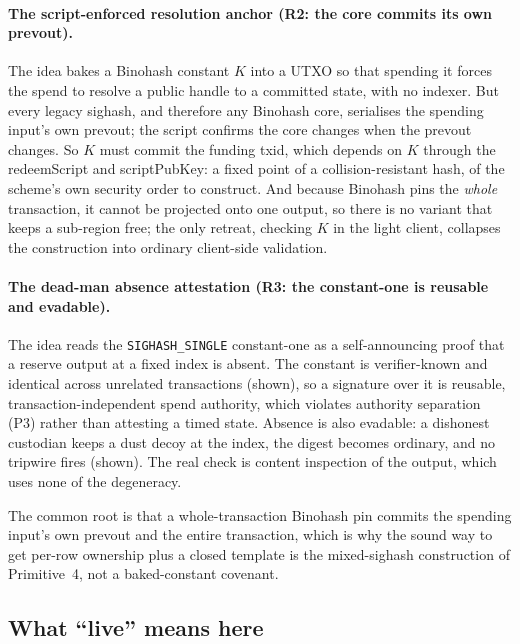 \documentclass[11pt]{article}
\begin{document}
\paragraph{The script-enforced resolution anchor (R2: the core commits its own
prevout).} The idea bakes a Binohash constant $K$ into a UTXO so that spending it
forces the spend to resolve a public handle to a committed state, with no
indexer. But every legacy sighash, and therefore any Binohash core, serialises
the spending input's own prevout; the script confirms the core changes when the
prevout changes. So $K$ must commit the funding txid, which depends on $K$
through the redeemScript and scriptPubKey: a fixed point of a collision-resistant
hash, of the scheme's own security order to construct. And because Binohash pins
the \emph{whole} transaction, it cannot be projected onto one output, so there is
no variant that keeps a sub-region free; the only retreat, checking $K$ in the
light client, collapses the construction into ordinary client-side validation.

\paragraph{The dead-man absence attestation (R3: the constant-one is reusable and
evadable).} The idea reads the \texttt{SIGHASH\_SINGLE} constant-one as a
self-announcing proof that a reserve output at a fixed index is absent. The
constant is verifier-known and identical across unrelated transactions (shown),
so a signature over it is reusable, transaction-independent spend authority, which
violates authority separation (P3) rather than attesting a timed state. Absence
is also evadable: a dishonest custodian keeps a dust decoy at the index, the
digest becomes ordinary, and no tripwire fires (shown). The real check is content
inspection of the output, which uses none of the degeneracy.

The common root is that a whole-transaction Binohash pin commits the spending
input's own prevout and the entire transaction, which is why the sound way to get
per-row ownership plus a closed template is the mixed-sighash construction of
Primitive~4, not a baked-constant covenant.

\subsection{What ``live'' means here}
\end{document}
